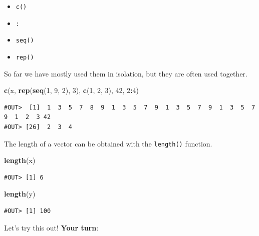 \documentclass[]{book}
\newenvironment{Shaded}{\begin{snugshade}}{\end{snugshade}}
\newcommand{\KeywordTok}[1]{\textcolor[rgb]{0.13,0.29,0.53}{\textbf{#1}}}
\newcommand{\DecValTok}[1]{\textcolor[rgb]{0.00,0.00,0.81}{#1}}
\newcommand{\OperatorTok}[1]{\textcolor[rgb]{0.81,0.36,0.00}{\textbf{#1}}}
\newcommand{\NormalTok}[1]{#1}
\providecommand{\tightlist}{%
  \setlength{\itemsep}{0pt}\setlength{\parskip}{0pt}}
\newenvironment{warning}{\begin{tcolorbox}[colback=orange!5!white,colframe=orange]}{\end{tcolorbox}}
\begin{document}
\begin{itemize}
\tightlist
\item
  \texttt{c()}
\item
  \texttt{:}
\item
  \texttt{seq()}
\item
  \texttt{rep()}
\end{itemize}

So far we have mostly used them in isolation, but they are often used
together.

\begin{Shaded}
\begin{Highlighting}[]
\KeywordTok{c}\NormalTok{(x, }\KeywordTok{rep}\NormalTok{(}\KeywordTok{seq}\NormalTok{(}\DecValTok{1}\NormalTok{, }\DecValTok{9}\NormalTok{, }\DecValTok{2}\NormalTok{), }\DecValTok{3}\NormalTok{), }\KeywordTok{c}\NormalTok{(}\DecValTok{1}\NormalTok{, }\DecValTok{2}\NormalTok{, }\DecValTok{3}\NormalTok{), }\DecValTok{42}\NormalTok{, }\DecValTok{2}\OperatorTok{:}\DecValTok{4}\NormalTok{)}
\end{Highlighting}
\end{Shaded}

\begin{verbatim}
#OUT>  [1]  1  3  5  7  8  9  1  3  5  7  9  1  3  5  7  9  1  3  5  7  9  1  2  3 42
#OUT> [26]  2  3  4
\end{verbatim}

The length of a vector can be obtained with the \texttt{length()}
function.

\begin{Shaded}
\begin{Highlighting}[]
\KeywordTok{length}\NormalTok{(x)}
\end{Highlighting}
\end{Shaded}

\begin{verbatim}
#OUT> [1] 6
\end{verbatim}

\begin{Shaded}
\begin{Highlighting}[]
\KeywordTok{length}\NormalTok{(y)}
\end{Highlighting}
\end{Shaded}

\begin{verbatim}
#OUT> [1] 100
\end{verbatim}

\begin{warning}
Let's try this out! \textbf{Your turn}:
\end{warning}
\end{document}
